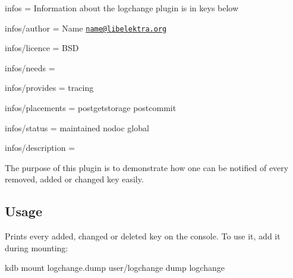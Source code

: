 
\begin{DoxyItemize}
\item infos = Information about the logchange plugin is in keys below
\item infos/author = Name \href{mailto:name@libelektra.org}{\tt name@libelektra.\+org}
\item infos/licence = B\+S\+D
\item infos/needs =
\item infos/provides = tracing
\item infos/placements = postgetstorage postcommit
\item infos/status = maintained nodoc global
\item infos/description =
\end{DoxyItemize}

The purpose of this plugin is to demonstrate how one can be notified of every removed, added or changed key easily.

\subsection*{Usage}

Prints every added, changed or deleted key on the console. To use it, add it during mounting\+: \begin{DoxyVerb}kdb mount logchange.dump user/logchange dump logchange\end{DoxyVerb}
 